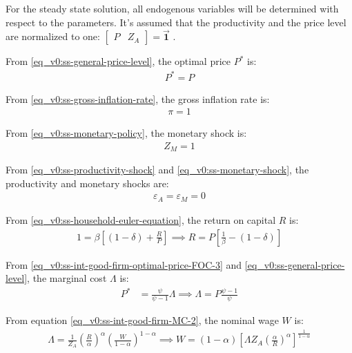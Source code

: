 \documentclass[../thesis.tex]{subfiles}
\begin{document}
	
	For the steady state solution, all endogenous variables will be determined with respect to the parameters. It's assumed that the productivity and the price level are normalized to one: $\left[ \begin{smallmatrix} P & Z_A \end{smallmatrix} \right] = \vec{\bm{1}}$ \footnotemark{}. 
	
	From \ref{eq_v0:ss-general-price-level}, the optimal price $P^\ast$ is:
	\begin{align}
		P^\ast = P
	\end{align}
	
	From \ref{eq_v0:ss-gross-inflation-rate}, the gross inflation rate is:
	\begin{align}
		\pi = 1
	\end{align}
	
	From \ref{eq_v0:ss-monetary-policy}, the monetary shock is:
	\begin{align}
		Z_{M} = 1
	\end{align}
	
	From \ref{eq_v0:ss-productivity-shock} and \ref{eq_v0:ss-monetary-shock}, the productivity and monetary shocks are:
	\begin{align}
		\varepsilon_{A} = \varepsilon_{M} = 0
	\end{align}
	
	From \ref{eq_v0:ss-household-euler-equation}, the return on capital $R$ is:
	\begin{align}
		\label{eq_v0:ss-return-on-capital}
		1 = \beta \left[ (1-\delta) + \frac{R}{P} \right] \implies 
		R = P\left[ \frac{1}{\beta} - (1-\delta) \right]
	\end{align}
	
	From \ref{eq_v0:ss-int-good-firm-optimal-price-FOC-3} and \ref{eq_v0:ss-general-price-level}, the marginal cost $\Lambda$ is:
	\begin{align}
		\label{eq_v0:ss-marginal-cost}
		P^\ast &= \frac{\psi}{\psi-1} \Lambda \implies 
		\Lambda = P \frac{\psi-1}{\psi}
	\end{align}
	
	From equation \ref{eq_v0:ss-int-good-firm-MC-2}, the nominal wage $W$ is:
	\begin{align}
		\Lambda = \frac{1}{Z_{A}} \left( \frac{R}{\alpha} \right)^{\alpha} \left( \frac{W}{1-\alpha} \right)^{1-\alpha} \implies 
		W = (1-\alpha) \left[ \Lambda Z_{A} \left( \frac{\alpha}{R} \right)^{\alpha} \right]^\frac{1}{1-\alpha} 
		\label{eq_v0:ss-nominal-wage}
	\end{align}
	
\end{document}
